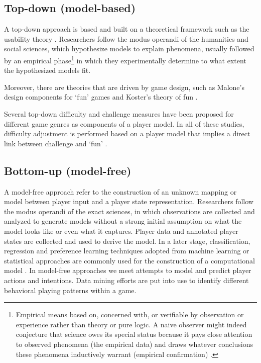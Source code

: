 \subsection{Top-down (model-based)}
A top-down approach is based and built on a theoretical framework such as the usability theory \citep{Gameusabilityjnd}.
Researchers follow the modus operandi of the humanities and social sciences, which hypothesize models to explain phenomena, usually followed by an empirical phase\footnote{Empirical means based on, concerned with, or verifiable by observation or experience rather than theory or pure logic. A naive observer might indeed conjecture that science owes its special status because it pays close attention to observed phenomena (the empirical data) and draws whatever conclusions these phenomena inductively warrant (empirical confirmation) \citep{StrevensWhatEmpiricalTesting}.} in which they experimentally determine to what extent the hypothesized models fit.

Moreover, there are theories that are driven by game design, such as Malone’s design components for ‘fun’ games \citep{MaloneWhatMakesThings1980} and Koster’s theory of fun \citep{TheoryFunGame}.

Several top-down difficulty and challenge measures have been proposed for different game genres as components of a player model. In all of these studies, difficulty adjustment is performed based on a player model that implies a direct link between challenge and ‘fun’ \citep{YannakakisPlayerModeling2013}.

\subsection{Bottom-up (model-free)}
A model-free approach refer to the construction of an unknown mapping or model between player input and a player state representation.
Researchers follow the modus operandi of the exact sciences, in which observations are collected and analyzed to generate models without a strong initial assumption on what the model looks like or even what it captures. Player data and annotated player states are collected and used to derive the model. In a later stage, classification, regression and preference learning techniques adopted from machine learning or statistical approaches are commonly used for the construction of a computational model  \citep{YannakakisPlayerModeling2013}. In model-free approaches we meet attempts to model and predict player actions and intentions. Data mining efforts are put into use to identify different behavioral playing patterns within a game.

